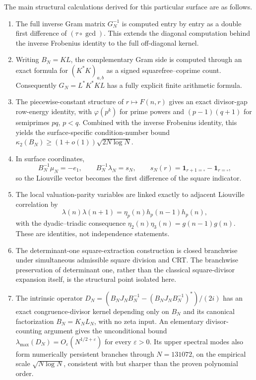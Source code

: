 \documentclass[11pt]{amsart}
\numberwithin{equation}{section}
\theoremstyle{plain}
\theoremstyle{definition}
\theoremstyle{remark}
\newcommand{\one}{\mathbf 1}
\newcommand{\eps}{\varepsilon}
\newcommand{\mob}{\mu}
\newcommand{\liou}{\lambda}
\begin{document}
The main structural calculations derived for this particular surface are as follows.
\begin{enumerate}[label=(\roman*)]
\item The full inverse Gram matrix $G_N^{-1}$ is computed entry by entry as a double first difference of $(\tau\circ\gcd)$.  This extends the diagonal computation behind the inverse Frobenius identity to the full off-diagonal kernel.
\item Writing $B_N=KL$, the complementary Gram side is computed through an exact formula for $(K^*K)_{a,b}$ as a signed squarefree--coprime count.  Consequently $G_N=L^*K^*KL$ has a fully explicit finite arithmetic formula.
\item The piecewise-constant structure of $r\mapsto F(n,r)$ gives an exact divisor-gap row-energy identity, with $\varphi(p^k)$ for prime powers and $(p-1)(q+1)$ for semiprimes $pq$, $p<q$.  Combined with the inverse Frobenius identity, this yields the surface-specific condition-number bound $\kappa_2(B_N)\ge(1+o(1))\sqrt{2N\log N}$.
\item In surface coordinates,
\begin{equation}
B_N^{-1}\mob_N=-e_1,
\qquad
B_N^{-1}\liou_N=s_N,
\qquad
s_N(r)=\one_{r+1=\square}-\one_{r=\square},
\label{eq:mu_lambda_coordinate_preview}
\end{equation}
so the Liouville vector becomes the first difference of the square indicator.
\item The local valuation-parity variables are linked exactly to adjacent Liouville correlation by
\begin{equation}
\liou(n)\liou(n+1)=\eta_p(n)h_p(n-1)h_p(n),
\label{eq:intro_eta_lambda_bridge}
\end{equation}
with the dyadic--triadic consequence $\eta_2(n)\eta_3(n)=g(n-1)g(n)$.  These are identities, not independence statements.
\item The determinant-one square-extraction construction is closed branchwise under simultaneous admissible square division and CRT.  The branchwise preservation of determinant one, rather than the classical square-divisor expansion itself, is the structural point isolated here.
\item The intrinsic operator $D_N=(B_NJ_NB_N^{-1}-(B_NJ_NB_N^{-1})^*)/(2i)$ has an exact congruence-divisor kernel depending only on $B_N$ and its canonical factorization $B_N=K_NL_N$, with no zeta input.  An elementary divisor-counting argument gives the unconditional bound $\lambda_{\max}(D_N)=O_\eps(N^{1/2+\eps})$ for every $\eps>0$.  Its upper spectral modes also form numerically persistent branches through $N=131072$, on the empirical scale $\sqrt{N\log N}$, consistent with but sharper than the proven polynomial order.
\end{enumerate}
\end{document}
